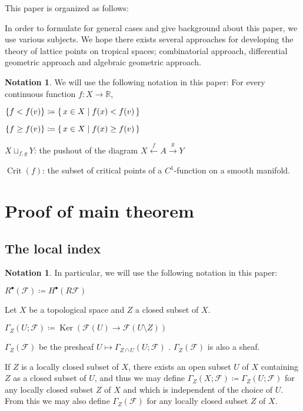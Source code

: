 \documentclass[a4paper,dvipdfmx,reqno,12pt]{amsart}
\theoremstyle{definition}
\newtheorem{Not}[Thm]{Notation}
\newcommand{\deq}{\coloneqq}
\newcommand{\R}{\mathbb{R}}%
\newcommand{\mcal}[1]{\mathcal{#1}}%
\newcommand{\opn}[1]{\operatorname{#1}}
\newcommand{\xto}[1]{\xrightarrow{#1}}
\newcommand{\xgets}[1]{\xleftarrow{#1}}
\numberwithin{equation}{section}
\begin{document}
This paper is organized as follows:

In order to formulate for general cases and give background about this paper, we use various subjects.
We hope there exists several approaches for developing the theory of lattice points on tropical spaces; combinatorial approach, differential geometric approach and algebraic geometric approach.

\begin{Not}

  We will use the following notation in this paper:
  For every continuous function $f\colon X\to \R$,

  $\{f<f(v)\}\deq \set{x\in X\mid f(x)< f(v)}$

  $\{f\geq f(v)\}\deq \set{x\in X\mid f(x)\geq f(v)}$

  $X\sqcup_{f,g}Y$: the pushout of the diagram
  $X\xgets{f} A\xto{g} Y$

  $\opn{Crit}(f)$: the subset of critical points of a
  $C^{1}$-function on a smooth manifold.
\end{Not}



\section{Proof of main theorem}



\subsection{The local index}



\begin{Not}
  
  In particular, we will use the following notation in this paper:

  $R^{\bullet}(\mcal{F})\deq H^{\bullet}(R\mcal{F})$

\end{Not}

Let $X$ be a topological space and $Z$ a closed subset of $X$.

$\Gamma_{Z}(U;\mcal{F})\deq \opn{Ker}(\mcal{F}(U)\to \mcal{F}(U\setminus Z))$

$\Gamma_{Z}(\mcal{F})$ be the presheaf
$U\mapsto \Gamma_{Z\cap U}(U;\mcal{F})$
\cite[Definition 2.3.8]{MR1299726}.
$\Gamma_{Z}(\mcal{F})$ is also a sheaf.

If $Z$ is a locally closed subset of $X$, there exists
an open subset $U$ of $X$ containing $Z$ as a closed
subset of $U$, and thus we may define
$\Gamma_{Z}(X;\mcal{F})\deq \Gamma_{Z}(U;\mcal{F})$
for any locally closed subset $Z$ of $X$ and which is
independent of the choice of $U$. From this we may also
define $\Gamma_{Z}(\mcal{F})$ for any locally closed subset $Z$ of
$X$.
\end{document}
